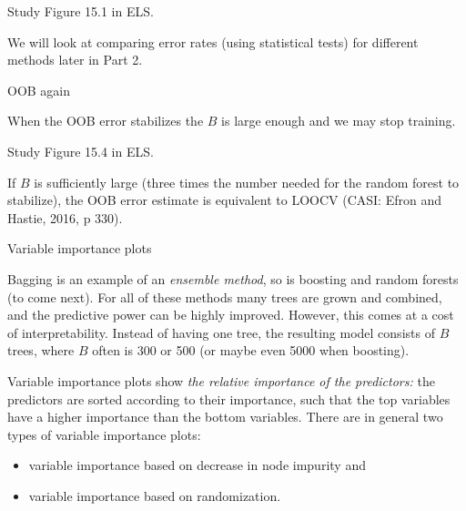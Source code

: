 \documentclass[
  ignorenonframetext,
]{beamer}
\providecommand{\tightlist}{%
  \setlength{\itemsep}{0pt}\setlength{\parskip}{0pt}}
\begin{document}
\begin{frame}

Study Figure 15.1 in ELS.

We will look at comparing error rates (using statistical tests) for
different methods later in Part 2.

\end{frame}

\begin{frame}

\begin{block}{OOB again}

When the OOB error stabilizes the \(B\) is large enough and we may stop
training.

Study Figure 15.4 in ELS.

If \(B\) is sufficiently large (three times the number needed for the
random forest to stabilize), the OOB error estimate is equivalent to
LOOCV (CASI: Efron and Hastie, 2016, p 330).

\end{block}

\end{frame}

\begin{frame}

\begin{block}{Variable importance plots}

Bagging is an example of an \emph{ensemble method}, so is boosting and
random forests (to come next). For all of these methods many trees are
grown and combined, and the predictive power can be highly improved.
However, this comes at a cost of interpretability. Instead of having one
tree, the resulting model consists of \(B\) trees, where \(B\) often is
300 or 500 (or maybe even 5000 when boosting).

Variable importance plots show \emph{the relative importance of the
predictors:} the predictors are sorted according to their importance,
such that the top variables have a higher importance than the bottom
variables. There are in general two types of variable importance plots:

\begin{itemize}
\tightlist
\item
  variable importance based on decrease in node impurity and
\item
  variable importance based on randomization.
\end{itemize}

\end{block}

\end{frame}
\end{document}

